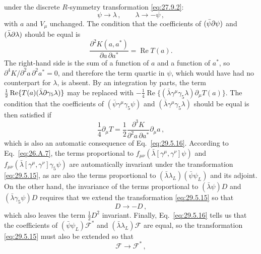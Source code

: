 under the discrete \(R\)-symmetry transformation \eqref{eq:27.9.2}:
\begin{equation}
  \psi\longrightarrow\lambda\,,
  \qquad
  \lambda\longrightarrow-\psi\,,
  \tag{29.5.15}\label{eq:29.5.15}
\end{equation}
with \(a\) and \(V_\mu\) unchanged. The condition that the coefficients of
\((\bar\psi\sl{\partial}\psi)\) and
\((\bar\lambda\sl{\partial}\lambda)\) should be equal is
\begin{equation}
  \frac{\partial^2K(a,a^*)}{\partial a\,\partial a^*}
  =\operatorname{Re}T(a).
  \tag{29.5.16}\label{eq:29.5.16}
\end{equation}
The right-hand side is the sum of a function of \(a\) and a function of
\(a^*\), so
\(\partial^4K/\partial^2a\,\partial^2a^*=0\), and therefore the term quartic
in \(\psi\), which would have had no counterpart for \(\lambda\), is absent.
By an integration by parts, the term
\(\tfrac12\operatorname{Re}\{T(a)(\bar\lambda\sl{\partial}\gamma_5\lambda)\}\)
may be replaced with
\(-\tfrac14\operatorname{Re}\{(\bar\lambda\gamma^\mu\gamma_5\lambda)
\partial_\mu T(a)\}\). The condition that the coefficients of
\((\bar\psi\gamma^\mu\gamma_5\psi)\) and
\((\bar\lambda\gamma^\mu\gamma_5\lambda)\) should be equal is then satisfied
if
\[
  \frac14\partial_\mu T
  =\frac12
    \frac{\partial^3K}{\partial^2a\,\partial a^*}\partial_\mu a\,,
\]
which is also an automatic consequence of Eq.~\eqref{eq:29.5.16}.
According to Eq.~\eqref{eq:26.A.7}, the terms proportional to
\(f_{\mu\nu}(\bar\lambda[\gamma^\mu,\gamma^\nu]\psi)\) and
\(f_{\mu\nu}(\bar\lambda[\gamma^\mu,\gamma^\nu]\gamma_5\psi)\) are
automatically invariant under the transformation \eqref{eq:29.5.15}, as are
also the terms proportional to
\((\bar\lambda\lambda_L)(\bar\psi\psi_L)\) and its adjoint. On the other
hand, the invariance of the terms proportional to
\((\bar\lambda\psi)D\) and \((\bar\lambda\gamma_5\psi)D\) requires that we
extend the transformation \eqref{eq:29.5.15} so that
\begin{equation}
  D\longrightarrow-D\,,
  \tag{29.5.17}\label{eq:29.5.17}
\end{equation}
which also leaves the term \(\tfrac12D^2\) invariant. Finally,
Eq.~\eqref{eq:29.5.16} tells us that the coefficients of
\((\bar\psi\psi_L)\mathcal{F}^*\) and
\((\bar\lambda\lambda_L)\mathcal{F}\) are equal, so the transformation
\eqref{eq:29.5.15} must also be extended so that
\begin{equation}
  \mathcal{F}\longrightarrow\mathcal{F}^*\,,
  \tag{29.5.18}\label{eq:29.5.18}
\end{equation}
